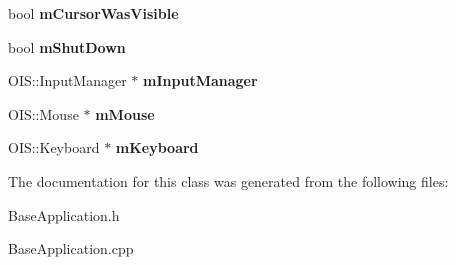 \begin{DoxyCompactItemize}
\item 
bool {\bfseries m\+Cursor\+Was\+Visible}\hypertarget{class_base_application_ac7e861799862cb645f1d78b170aef80d}{}\label{class_base_application_ac7e861799862cb645f1d78b170aef80d}

\item 
bool {\bfseries m\+Shut\+Down}\hypertarget{class_base_application_a755f26d3a9915aaf830750d877e39d86}{}\label{class_base_application_a755f26d3a9915aaf830750d877e39d86}

\item 
O\+I\+S\+::\+Input\+Manager $\ast$ {\bfseries m\+Input\+Manager}\hypertarget{class_base_application_abc9503c8462e225b5d0d55c952d9e4a9}{}\label{class_base_application_abc9503c8462e225b5d0d55c952d9e4a9}

\item 
O\+I\+S\+::\+Mouse $\ast$ {\bfseries m\+Mouse}\hypertarget{class_base_application_add9b97fbe64da2814d3af113bac58c43}{}\label{class_base_application_add9b97fbe64da2814d3af113bac58c43}

\item 
O\+I\+S\+::\+Keyboard $\ast$ {\bfseries m\+Keyboard}\hypertarget{class_base_application_a9d6e19cf50c47379fbaae55bff28079c}{}\label{class_base_application_a9d6e19cf50c47379fbaae55bff28079c}

\end{DoxyCompactItemize}


The documentation for this class was generated from the following files\+:\begin{DoxyCompactItemize}
\item 
Base\+Application.\+h\item 
Base\+Application.\+cpp\end{DoxyCompactItemize}
